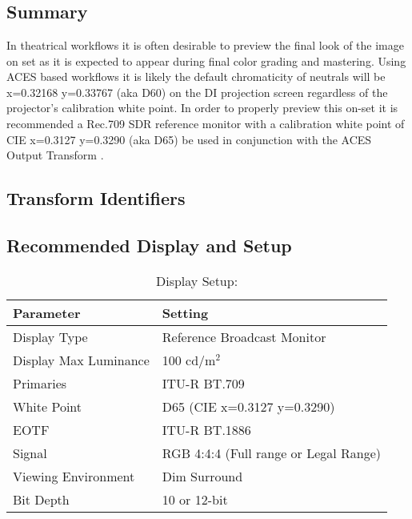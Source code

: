 \section[Rec709 (D60 sim)]{\shortName{}}
\label{sec:odt-details-\id}

\subsection{Summary}
\label{subsec:summary-\id}


In theatrical workflows it is often desirable to preview the final look of the image on set as it is expected to appear during final color grading and mastering.  Using ACES based workflows it is likely the default chromaticity of neutrals will be x=0.32168 y=0.33767 (aka D60) on the DI projection screen regardless of the projector's calibration white point.  In order to properly preview this on-set it is recommended a Rec.709 SDR reference monitor with a calibration white point of CIE x=0.3127 y=0.3290 (aka D65) be used in conjunction with the ACES Output Transform \transformID{}.


\subsection{Transform Identifiers} 
\label{subsec:odt-ident-\id}

\subsection{Recommended Display and Setup}
\label{subsec:setup-\id}

\begin{table}[ht!]
    \centering
        \begin{tabular}{|p{1.5in}|p{3in}|}
            \hline
            \textbf{Parameter} 		& 	\textbf{Setting} 				 		\\ \hline
            Display Type 			&	Reference Broadcast Monitor				\\ \hline
            Display Max Luminance 	& 	100 cd/m$^2$							\\ \hline
            Primaries	 			& 	ITU-R BT.709							\\ \hline
            White Point	 			& 	D65 (CIE x=0.3127 y=0.3290)				\\ \hline
            EOTF					& 	ITU-R BT.1886		 					\\ \hline
            Signal 					&	RGB 4:4:4 (Full range or Legal Range)	\\ \hline
            Viewing Environment 	& 	Dim Surround							\\ \hline
            Bit Depth 				& 	10 or 12-bit	 						\\ \hline 
    \end{tabular}
    \caption{Display Setup: \shortName{}} 
    \label{tab:setup-\id}
\end{table}

